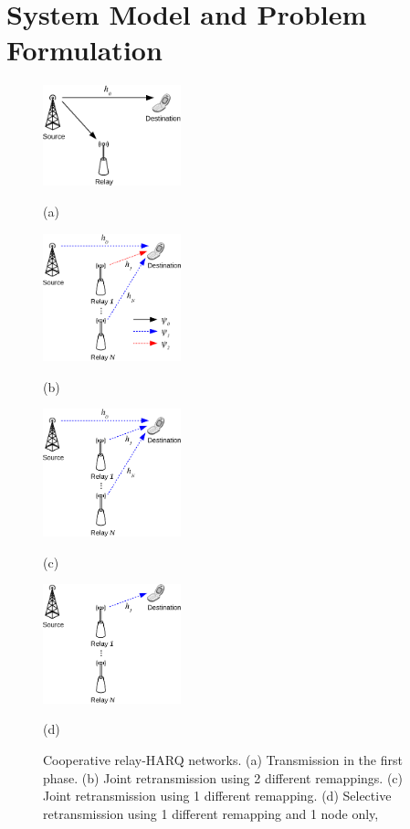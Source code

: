 \documentclass[conference]{IEEEtran}
\begin{document}
\section{System Model and Problem Formulation}
\label{sec:model}
\begin{figure}[!t]
    \begin{minipage}[b]{0.48\linewidth}
      \centering
      \centerline{\includegraphics[width=4.0cm]{./figs/relayHARQ1.eps}}
      \centerline{(a)}\medskip
    \end{minipage}
    \hfill
    \begin{minipage}[b]{.48\linewidth}
      \centering
      \centerline{\includegraphics[width=4.0cm]{./figs/relayHARQ2_MISO_Q3AP.eps}}
      \centerline{(b)}\medskip
    \end{minipage}
    \hfill
    \begin{minipage}[b]{0.48\linewidth}
      \centering
      \centerline{\includegraphics[width=4.0cm]{./figs/relayHARQ2_MISO_QAP.eps}}
      \centerline{(c)}\medskip
    \end{minipage}
    \hfill
    \begin{minipage}[b]{.48\linewidth}
      \centering
      \centerline{\includegraphics[width=4.0cm]{./figs/relayHARQ2_SISO_QAP.eps}}
      \centerline{(d)}\medskip
    \end{minipage}
    \caption{Cooperative relay-HARQ networks. (a) Transmission in the first
    phase. (b) Joint retransmission using 2 different remappings. (c) Joint
    retransmission using 1 different remapping. (d) Selective retransmission
    using 1 different remapping and 1 node only,}
    \label{fig:system_model}
\end{figure}
\end{document}

